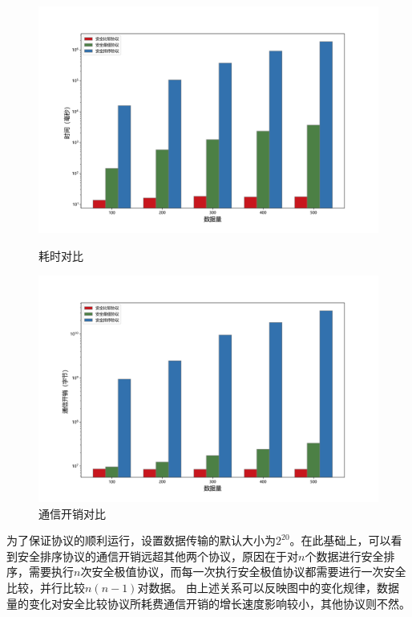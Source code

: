 \begin{figure}[htbp] %
	\begin{minipage}[t]{0.5\linewidth}
		\includegraphics[width=\linewidth]{img/timecompare.png}
		\caption{耗时对比}
		\label{s4-exp-tcost}
	\end{minipage}%
	\hfill%
	\begin{minipage}[t]{0.5\linewidth}
		\includegraphics[width=\linewidth]{img/commcompare.png}
		\caption{通信开销对比}
		\label{s4-exp-ccost}
	\end{minipage}
\end{figure}\textbf{}

为了保证协议的顺利运行，设置数据传输的默认大小为$ 2^{20} $。在此基础上，可以看到安全排序协议的通信开销远超其他两个协议，原因在于对$ n $个数据进行安全排序，需要执行$ n $次安全极值协议，而每一次执行安全极值协议都需要进行一次安全比较，并行比较$ n(n-1) $对数据。
由上述关系可以反映图中的变化规律，数据量的变化对安全比较协议所耗费通信开销的增长速度影响较小，其他协议则不然。

